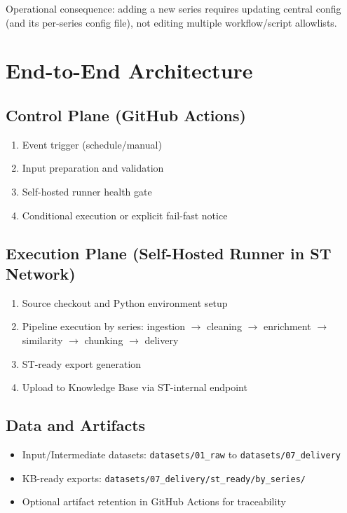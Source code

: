 \documentclass[11pt,a4paper]{article}
\begin{document}
Operational consequence: adding a new series requires updating central config (and its per-series config file), not editing multiple workflow/script allowlists.

\section{End-to-End Architecture}
\subsection{Control Plane (GitHub Actions)}
\begin{enumerate}
  \item Event trigger (schedule/manual)
  \item Input preparation and validation
  \item Self-hosted runner health gate
  \item Conditional execution or explicit fail-fast notice
\end{enumerate}

\subsection{Execution Plane (Self-Hosted Runner in ST Network)}
\begin{enumerate}
  \item Source checkout and Python environment setup
  \item Pipeline execution by series:
  ingestion $\rightarrow$ cleaning $\rightarrow$ enrichment $\rightarrow$ similarity $\rightarrow$ chunking $\rightarrow$ delivery
  \item ST-ready export generation
  \item Upload to Knowledge Base via ST-internal endpoint
\end{enumerate}

\subsection{Data and Artifacts}
\begin{itemize}
  \item Input/Intermediate datasets: \texttt{datasets/01\_raw} to \texttt{datasets/07\_delivery}
  \item KB-ready exports: \texttt{datasets/07\_delivery/st\_ready/by\_series/}
  \item Optional artifact retention in GitHub Actions for traceability
\end{itemize}
\end{document}
